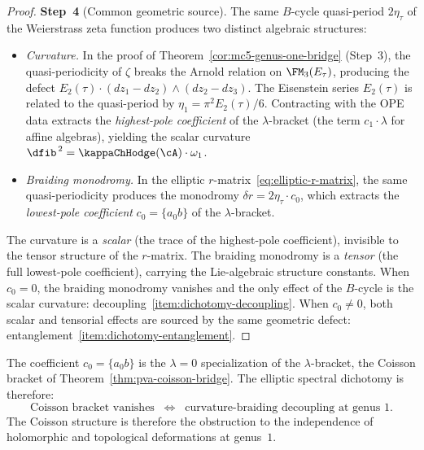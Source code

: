 \begin{proof}
\textbf{Step~4} (Common geometric source).
The same $B$-cycle quasi-period $2\eta_\tau$ of the Weierstrass
zeta function produces two distinct algebraic structures:
\begin{itemize}
\item \emph{Curvature.}
In the proof of Theorem~\ref{cor:mc5-genus-one-bridge}
(Step~3), the quasi-periodicity of $\zeta$ breaks the Arnold
relation on $\FM_3(E_\tau)$, producing the defect
$E_2(\tau) \cdot (dz_1 - dz_2) \wedge (dz_2 - dz_3)$.
The Eisenstein series $E_2(\tau)$ is related to the
quasi-period by $\eta_1 = \pi^2 E_2(\tau) / 6$.
Contracting with the OPE data extracts the
\emph{highest-pole coefficient} of the $\lambda$-bracket
(the term $c_1 \cdot \lambda$ for affine algebras), yielding
the scalar curvature
$\dfib^{\,2} = \kappaChHodge(\cA) \cdot \omega_1$.

\item \emph{Braiding monodromy.}
In the elliptic $r$-matrix~\eqref{eq:elliptic-r-matrix},
the same quasi-periodicity produces the monodromy
$\delta r = 2\eta_\tau \cdot c_0$, which extracts the
\emph{lowest-pole coefficient} $c_0 = \{a {}_0 b\}$ of the
$\lambda$-bracket.
\end{itemize}
The curvature is a \emph{scalar} (the trace of the
highest-pole coefficient), invisible to the tensor structure
of the $r$-matrix.
The braiding monodromy is a \emph{tensor} (the full
lowest-pole coefficient), carrying the Lie-algebraic structure
constants. When $c_0 = 0$, the braiding monodromy vanishes
and the only effect of the $B$-cycle is the scalar curvature:
decoupling~\ref{item:dichotomy-decoupling}. When
$c_0 \ne 0$, both scalar and tensorial effects are sourced
by the same geometric defect:
entanglement~\ref{item:dichotomy-entanglement}.
\end{proof}

\begin{remark}
The coefficient $c_0 = \{a {}_0 b\}$ is the $\lambda = 0$
specialization of the $\lambda$-bracket, the Coisson bracket
of Theorem~\ref{thm:pva-coisson-bridge}. The elliptic spectral
dichotomy is therefore:
\[
\text{Coisson bracket vanishes}
\;\;\Longleftrightarrow\;\;
\text{curvature-braiding decoupling at genus~$1$}.
\]
The Coisson structure is therefore the obstruction to the independence of holomorphic
and topological deformations at genus~$1$.
\end{remark}

